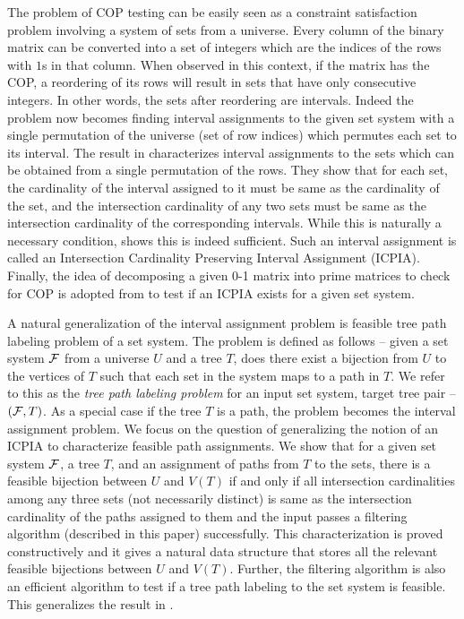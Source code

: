 \documentclass[11pt,
               envcountsect,
               envcountsame]
               {../lib/llncs2e/llncs}
\def\cF{{\cal F}}
\begin{document}
The problem of COP testing can be easily seen as a constraint
satisfaction problem involving a system of sets from a universe. Every
column of the binary matrix can be converted into a set of integers
which are the indices of the rows with $1$s in that column. When
observed in this context, if the matrix has the COP, a reordering of
its rows will result in sets that have only consecutive integers. In
other words, the sets after reordering are intervals. Indeed the
problem now becomes finding interval assignments to the given set
system \cite{nsnrs09} with a single permutation of the universe (set
of row indices) which permutes each set to its interval. The result in
\cite{nsnrs09} characterizes interval assignments to the sets which
can be obtained from a single permutation of the rows.  They show that
for each set, the cardinality of the interval assigned to it must be
same as the cardinality of the set, and the intersection cardinality
of any two sets must be same as the intersection cardinality of the
corresponding intervals.  While this is naturally a necessary
condition, \cite{nsnrs09} shows this is indeed sufficient.  Such an
interval assignment is called an Intersection Cardinality Preserving
Interval Assignment (ICPIA).  Finally, the idea of decomposing a given
0-1 matrix into prime matrices to check for COP is adopted from
\cite{wlh02} to test if an ICPIA exists for a given set system.

  A natural generalization of the interval
assignment problem is feasible tree path labeling problem of a set
system. The problem is defined as follows -- given a set system $\cF$
from a universe $U$ and a tree $T$, does there exist a bijection from
$U$ to the vertices of $T$ such that each set in the system maps to a
path in $T$.  We refer to this as the {\em tree path labeling problem}
for an input set system, target tree pair -- $(\cF,T)$. As a special
case if the tree $T$ is a path, the problem becomes the interval
assignment problem.  We focus on the question of generalizing the
notion of an ICPIA \cite{nsnrs09} to characterize feasible path
assignments.  We show that for a given set system $\cF$, a tree $T$,
and an assignment of paths from $T$ to the sets, there is a feasible
bijection between $U$ and $V(T)$ if and only if all intersection
cardinalities among any three sets (not necessarily distinct) is same
as the intersection cardinality of the paths assigned to them and the
input passes a filtering algorithm (described in this paper)
successfully.  This characterization is proved constructively and it
gives a natural data structure that stores all the relevant feasible
bijections between $U$ and $V(T)$.  Further, the filtering algorithm
is also an efficient algorithm to test if a tree path labeling to the
set system is feasible.  This generalizes the result in
\cite{nsnrs09}.
\end{document}
